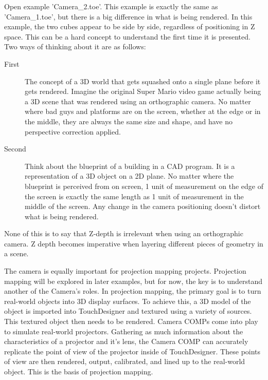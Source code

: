 \begin{fullwidth}
Open example 'Camera\_2.toe'. This example is exactly the same as 'Camera\_1.toe', but there is a big difference in what is being rendered. In this example, the two cubes appear to be side by side, regardless of positioning in Z space. This can be a hard concept to understand the first time it is presented. Two ways of thinking about it are as follows:

\begin{description}
\item[First] The concept of a 3D world that gets squashed onto a single plane before it gets rendered. Imagine the original Super Mario video game actually being a 3D scene that was rendered using an orthographic camera. No matter where bad guys and platforms are on the screen, whether at the edge or in the middle, they are always the same size and shape, and have no perspective correction applied.
\item[Second] Think about the blueprint of a building in a CAD program. It is a representation of a 3D object on a 2D plane. No matter where the blueprint is perceived from on screen, 1 unit of measurement on the edge of the screen is exactly the same length as 1 unit of measurement in the middle of the screen. Any change in the camera positioning doesn't distort what is being rendered.
\end{description}

None of this is to say that Z-depth is irrelevant when using an orthographic camera. Z depth becomes imperative when layering different pieces of geometry in a scene. 

The camera is equally important for projection mapping projects. Projection mapping will be explored in later examples, but for now, the key is to understand another of the Camera's roles. In projection mapping, the primary goal is to turn real-world objects into 3D display surfaces. To achieve this, a 3D model of the object is imported into TouchDesigner and textured using a variety of sources. This textured object then needs to be rendered. Camera COMPs come into play to simulate real-world projectors. Gathering as much information about the characteristics of a projector and it's lens, the Camera COMP can accurately replicate the point of view of the projector inside of TouchDesigner. These points of view are then rendered, output, calibrated, and lined up to the real-world object. This is the basis of projection mapping. 


\end{fullwidth}
